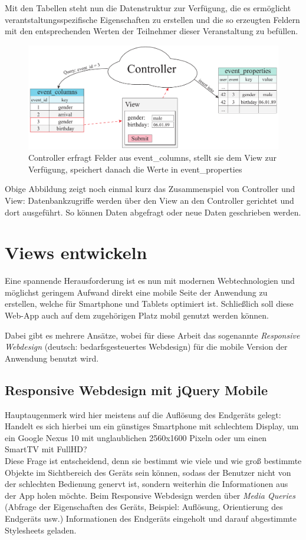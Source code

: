 Mit den Tabellen steht nun die Datenstruktur zur Verfügung, die es ermöglicht verantstaltungsspezifische Eigenschaften zu erstellen und die so erzeugten Feldern mit den entsprechenden Werten der Teilnehmer dieser Veranstaltung zu befüllen.

\begin{figure}[!ht]
	\centering
	\includegraphics[width=15cm]{fig/event_properties}
	\caption{Controller erfragt Felder aus event\_columns, stellt sie dem View zur Verfügung, speichert danach die Werte in event\_properties}
\end{figure}

Obige Abbildung zeigt noch einmal kurz das Zusammenspiel von Controller und View: Datenbankzugriffe werden über den View an den Controller gerichtet und dort ausgeführt. So können Daten abgefragt oder neue Daten geschrieben werden.

\section{Views entwickeln}
Eine spannende Herausforderung ist es nun mit modernen Webtechnologien und möglichst geringem Aufwand direkt eine mobile Seite der Anwendung zu erstellen, welche für Smartphone und Tablets optimiert ist. Schließlich soll diese Web-App auch auf dem zugehörigen Platz mobil genutzt werden können.\par

Dabei gibt es mehrere Ansätze, wobei für diese Arbeit das sogenannte \emph{Responsive Webdesign} (deutsch: bedarfsgesteuertes Webdesign) für die mobile Version der Anwendung benutzt wird.

\subsection{Responsive Webdesign mit jQuery Mobile}
Hauptaugenmerk wird hier meistens auf die Auflösung des Endgeräts gelegt: Handelt es sich hierbei um ein günstiges Smartphone mit schlechtem Display, um ein Google Nexus 10 mit unglaublichen 2560x1600 Pixeln oder um einen SmartTV mit FullHD?\\
Diese Frage ist entscheidend, denn sie bestimmt wie viele und wie groß bestimmte Objekte im Sichtbereich des Geräts sein können, sodass der Benutzer nicht von der schlechten Bedienung genervt ist, sondern weiterhin die Informationen aus der App holen möchte. Beim Responsive Webdesign werden über \emph{Media Queries} (Abfrage der Eigenschaften des Geräts, Beispiel: Auflösung, Orientierung des Endgeräts usw.) Informationen des Endgeräts eingeholt und darauf abgestimmte Stylesheets geladen.\par

